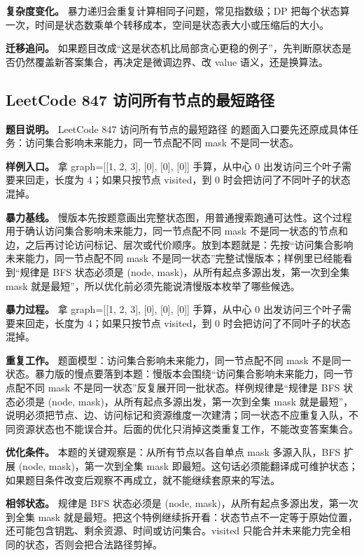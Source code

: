 \textbf{复杂度变化。} 暴力递归会重复计算相同子问题，常见指数级；DP 把每个状态算一次，时间是状态数乘单个转移成本，空间是状态表大小或压缩后的大小。

\textbf{迁移追问。} 如果题目改成“这是状态机比局部贪心更稳的例子”，先判断原状态是否仍然覆盖新答案集合，再决定是微调边界、改 value 语义，还是换算法。

\subsection{LeetCode 847 访问所有节点的最短路径}

\textbf{题目说明。} LeetCode 847 访问所有节点的最短路径 的题面入口要先还原成具体任务：访问集合影响未来能力，同一节点配不同 mask 不是同一状态。

\textbf{样例入口。} 拿 graph=[[1, 2, 3], [0], [0], [0]] 手算，从中心 0 出发访问三个叶子需要来回走，长度为 4；如果只按节点 visited，到 0 时会把访问了不同叶子的状态混掉。

\textbf{暴力基线。} 慢版本先按题意画出完整状态图，用普通搜索跑通可达性。这个过程用于确认访问集合影响未来能力，同一节点配不同 mask 不是同一状态的节点和边，之后再讨论访问标记、层次或代价顺序。放到本题就是：先按“访问集合影响未来能力，同一节点配不同 mask 不是同一状态”完整试慢版本；样例里已经能看到“规律是 BFS 状态必须是 (node, mask)，从所有起点多源出发，第一次到全集 mask 就是最短”，所以优化前必须先能说清慢版本枚举了哪些候选。

\textbf{暴力过程。} 拿 graph=[[1, 2, 3], [0], [0], [0]] 手算，从中心 0 出发访问三个叶子需要来回走，长度为 4；如果只按节点 visited，到 0 时会把访问了不同叶子的状态混掉。

\textbf{重复工作。} 题面模型：访问集合影响未来能力，同一节点配不同 mask 不是同一状态。暴力版的慢点要落到本题：慢版本会围绕“访问集合影响未来能力，同一节点配不同 mask 不是同一状态”反复展开同一批状态。样例规律是“规律是 BFS 状态必须是 (node, mask)，从所有起点多源出发，第一次到全集 mask 就是最短”，说明必须把节点、边、访问标记和资源维度一次建清；同一状态不应重复入队，不同资源状态也不能误合并。后面的优化只消掉这类重复工作，不能改变答案集合。

\textbf{优化条件。} 本题的关键观察是：从所有节点以各自单点 mask 多源入队，BFS 扩展 (node, mask)，第一次到全集 mask 即最短。这句话必须能翻译成可维护状态；如果题目条件改变后观察不再成立，就不能继续套原来的写法。

\textbf{相邻状态。} 规律是 BFS 状态必须是 (node, mask)，从所有起点多源出发，第一次到全集 mask 就是最短。把这个特例继续拆开看：状态节点不一定等于原始位置，还可能包含钥匙、剩余资源、时间或访问集合。visited 只能合并未来能力完全相同的状态，否则会把合法路径剪掉。

